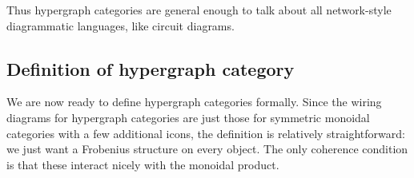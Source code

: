 \documentclass[7Sketches]{subfiles}
\begin{document}
Thus hypergraph categories are general enough to talk about all network-style
diagrammatic languages, like circuit diagrams. %

%
\subsection{Definition of hypergraph category}
We are now ready to define hypergraph categories formally. Since the wiring diagrams for hypergraph categories are just those for symmetric
monoidal categories with a few additional icons, the definition is relatively
straightforward: we just want a Frobenius structure on every object. The only
coherence condition is that these interact nicely with the monoidal product.
\end{document}
